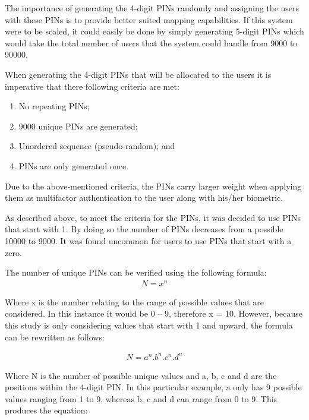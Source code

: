 The importance of generating the 4-digit PINs randomly and assigning the users with these PINs is to provide better suited mapping capabilities. If this system were to be scaled, it could easily be done by simply generating 5-digit PINs which would take the total number of users that the system could handle from 9000 to 90000.

When generating the 4-digit PINs that will be allocated to the users it is imperative that there following criteria are met:

\begin{enumerate}[label=\roman*.]
    \item No repeating PINs;
    \item 9000 unique PINs are generated;
    \item Unordered sequence (pseudo-random); and
    \item PINs are only generated once.
\end{enumerate}





Due to the above-mentioned criteria, the PINs carry larger weight when applying them as multifactor authentication to the user along with his/her biometric. 

As described above, to meet the criteria for the PINs, it was decided to use PINs that start with 1. By doing so the number of PINs decreases from a possible 10000 to 9000. It was found uncommon for users to use PINs that start with a zero. 

The number of unique PINs can be verified using the following formula:
\begin{gather}
    N =  x^{n}    
\end{gather}


Where x is the number relating to the range of possible values that are considered. In this instance it would be 0 – 9, therefore x = 10. However, because this study is only considering values that start with 1 and upward, the formula can be rewritten as follows:

\begin{gather}
    N = a^{n}.b^{n}.c^{n}.d^{n}    
\end{gather}


Where N is the number of possible unique values and a, b, c and d are the positions within the 4-digit PIN. In this particular example, a only has 9 possible values ranging from 1 to 9, whereas b, c and d can range from 0 to 9. This produces the equation:

